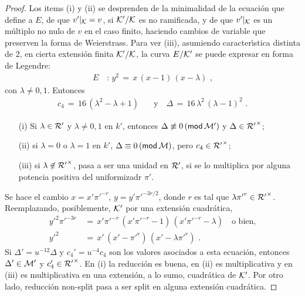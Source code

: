 \begin{proof}
	Los items (i) y (ii) se desprenden de la minimalidad de la ecuaci\'{o}n
	que define a $E$, de que $v'|_{\cal{K}}=v$, si $\cal{K}'/\cal{K}$ es no
	ramificada, y de que $v'|_{\cal{K}}$ es un m\'{u}ltiplo no nulo de $v$
	en el caso finito, haciendo cambios de variable que preserven la forma
	de Weierstrass. Para ver (iii), asumiendo caracter\'{\i}stica distinta
	de $2$, en cierta extensi\'{o}n finita $\cal{K}'/\cal{K}$, la curva
	$E/\cal{K}'$ se puede expresar en forma de Legendre:
	\begin{align*}
		E & \,:\, y^2 \,=\,x\,(x-1)\,(x-\lambda)
		\text{ ,}
	\end{align*}
	con $\lambda\not=0,1$. Entonces
	\begin{align*}
		c_{4}\,=\,16\,(\lambda^{2}-\lambda+1) & \quad\text{y}\quad
		\Delta \,=\,16\,\lambda^{2}\,(\lambda-1)^{2}
		\text{ .}
	\end{align*}
	\begin{itemize}
		\item[(i)] Si $\lambda\in\cal{R}'$ y $\lambda\not=0,1$ en $k'$,
			entonces $\Delta\not\equiv0\,(\modulo\,\cal{M}')$ y
			$\Delta\in{\cal{R}'}^{\times}$;
		\item[(ii)] si $\lambda =0$ o $\lambda=1$ en $k'$,
			$\Delta\equiv0\,(\modulo\,\cal{M})$, pero
			$c_4\in{\cal{R}'}^{\times}$;
		\item[(iii)] si $\lambda\not\in {\cal{R}'}^{\times}$, pasa a
			ser una unidad en $\cal{R}'$, si se lo multiplica por
			alguna potencia positiva del uniformizadr $\pi'$.
	\end{itemize}
	Se hace el cambio $x=x'{\pi'}^{-r}$, $y=y'{\pi'}^{-3r/2}$, donde
	$r$ es tal que $\lambda{\pi'}^{r}\in{\cal{R}'}^{\times}$. Reemplazando,
	posiblemente, $\cal{K}'$ por una extensi\'{o}n cuadr\'{a}tica,
	\begin{align*}
		{y'}^{2}{\pi'}^{-3r} & \,=\,x'{\pi'}^{-r}\,
			(x'{\pi'}^{-r}-1)\,(x'{\pi'}^{-r}-\lambda)
			\quad\text{o bien,} \\
		{y'}^{2} & \,=\,x'\,(x'-{\pi'}^{r})\,(x'-\lambda{\pi'}^{r})
		\text{ .}
	\end{align*}
	Si $\Delta'=u^{-12}\Delta$ y $c_4'=u^{-4}c_4$ son los valores asociados
	a esta ecuaci\'{o}n, entonces $\Delta'\in\cal{M}'$ y
	$c_4'\in{\cal{R}'}^{\times}$. En (i) la reducci\'{o}n es buena, en
	(ii) es multiplicativa y en (iii) es multiplicativa en una
	extensi\'{o}n, a lo sumo, cuadr\'{a}tica de $\cal{K}'$. Por otro lado,
	reducci\'{o}n non-split pasa a ser split en alguna extensi\'{o}n
	cuadr\'{a}tica.


\end{proof}
